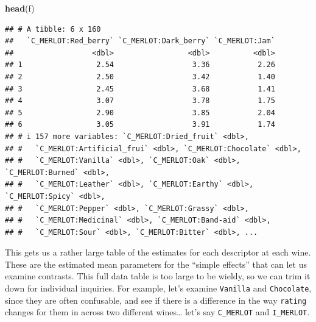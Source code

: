 \documentclass[
]{book}
\newenvironment{Shaded}{\begin{snugshade}}{\end{snugshade}}
\newcommand{\FunctionTok}[1]{\textcolor[rgb]{0.13,0.29,0.53}{\textbf{#1}}}
\newcommand{\NormalTok}[1]{#1}
\begin{document}
\begin{Shaded}
\begin{Highlighting}[]
\FunctionTok{head}\NormalTok{(f)}
\end{Highlighting}
\end{Shaded}

\begin{verbatim}
## # A tibble: 6 x 160
##   `C_MERLOT:Red_berry` `C_MERLOT:Dark_berry` `C_MERLOT:Jam`
##                  <dbl>                 <dbl>          <dbl>
## 1                 2.54                  3.36           2.26
## 2                 2.50                  3.42           1.40
## 3                 2.45                  3.68           1.41
## 4                 3.07                  3.78           1.75
## 5                 2.90                  3.85           2.04
## 6                 3.05                  3.91           1.74
## # i 157 more variables: `C_MERLOT:Dried_fruit` <dbl>,
## #   `C_MERLOT:Artificial_frui` <dbl>, `C_MERLOT:Chocolate` <dbl>,
## #   `C_MERLOT:Vanilla` <dbl>, `C_MERLOT:Oak` <dbl>, `C_MERLOT:Burned` <dbl>,
## #   `C_MERLOT:Leather` <dbl>, `C_MERLOT:Earthy` <dbl>, `C_MERLOT:Spicy` <dbl>,
## #   `C_MERLOT:Pepper` <dbl>, `C_MERLOT:Grassy` <dbl>,
## #   `C_MERLOT:Medicinal` <dbl>, `C_MERLOT:Band-aid` <dbl>,
## #   `C_MERLOT:Sour` <dbl>, `C_MERLOT:Bitter` <dbl>, ...
\end{verbatim}

This gets us a rather large table of the estimates for each descriptor at each wine. These are the estimated mean parameters for the ``simple effects'' that can let us examine contrasts. This full data table is too large to be wieldy, so we can trim it down for individual inquiries. For example, let's examine \texttt{Vanilla} and \texttt{Chocolate}, since they are often confusable, and see if there is a difference in the way \texttt{rating} changes for them in across two different wines\ldots{} let's say \texttt{C\_MERLOT} and \texttt{I\_MERLOT}.
\end{document}
